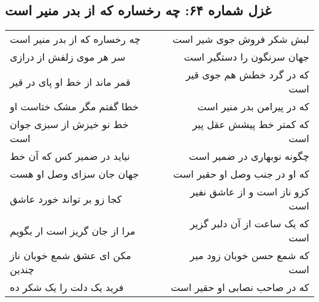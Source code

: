 \begin{center}
\section*{غزل شماره ۶۴: چه رخساره که از بدر منیر است}
\label{sec:064}
\begin{longtable}{l p{0.5cm} r}
چه رخساره که از بدر منیر است
&&
لبش شکر فروش جوی شیر است
\\
سر هر موی زلفش از درازی
&&
جهان سرنگون را دستگیر است
\\
قمر ماند از خط او پای در قیر
&&
که در گرد خطش هم جوی قیر است
\\
خطا گفتم مگر مشک ختاست او
&&
که در پیرامن بدر منیر است
\\
خط نو خیزش از سبزی جوان است
&&
که کمتر خط پیشش عقل پیر است
\\
نیاید در ضمیر کس که آن خط
&&
چگونه نوبهاری در ضمیر است
\\
جهان جان سزای وصل او هست
&&
که او در جنب وصل او حقیر است
\\
کجا زو بر تواند خورد عاشق
&&
کزو ناز است و از عاشق نفیر است
\\
مرا از جان گریز است ار بگویم
&&
که یک ساعت از آن دلبر گزیر است
\\
مکن ای عشق شمع خوبان ناز چندین
&&
که شمع حسن خوبان زود میر است
\\
فرید یک دلت را یک شکر ده
&&
که در صاحب نصابی او حقیر است
\\
\end{longtable}
\end{center}
